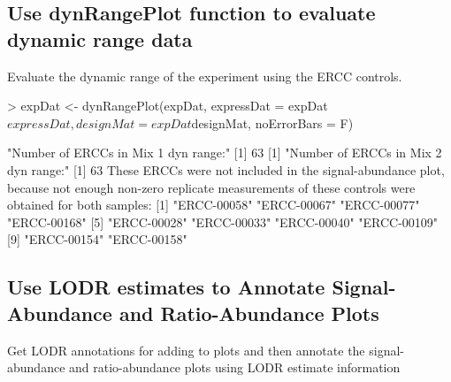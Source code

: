 \documentclass{article}
\begin{document}
\subsection{Use dynRangePlot function to evaluate dynamic range data}
Evaluate the dynamic range of the experiment using the ERCC controls.
\begin{center}
\begin{Schunk}
\begin{Sinput}
> expDat <- dynRangePlot(expDat, expressDat = expDat$expressDat,
                             designMat = expDat$designMat, noErrorBars = F)
\end{Sinput}
\begin{Soutput}
[1] "Number of ERCCs in Mix 1 dyn range:"
[1] 63
[1] "Number of ERCCs in Mix 2 dyn range:"
[1] 63
These ERCCs were not included in the signal-abundance plot,
because not enough non-zero replicate measurements of these 
controls were obtained for both samples:
 [1] "ERCC-00058" "ERCC-00067" "ERCC-00077" "ERCC-00168"
 [5] "ERCC-00028" "ERCC-00033" "ERCC-00040" "ERCC-00109"
 [9] "ERCC-00154" "ERCC-00158"
\end{Soutput}
\end{Schunk}
\end{center}

\subsection{Use LODR estimates to Annotate Signal-Abundance and Ratio-Abundance Plots}
Get LODR annotations for adding to plots and then annotate the signal-abundance
and ratio-abundance plots using LODR estimate information 
\end{document}

